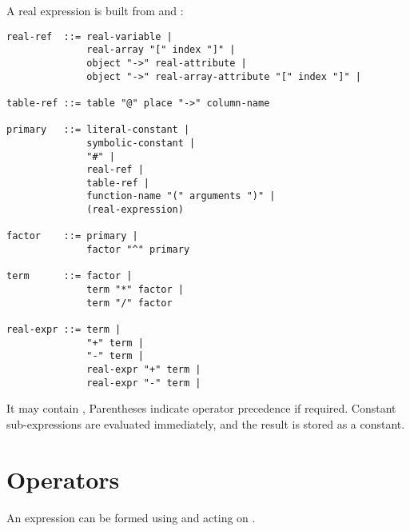 A real expression is built from  and 
:

\begin{footnotesize}
\begin{verbatim}
real-ref  ::= real-variable |
              real-array "[" index "]" |
              object "->" real-attribute |
              object "->" real-array-attribute "[" index "]" |

table-ref ::= table "@" place "->" column-name

primary   ::= literal-constant |
              symbolic-constant |
              "#" |
              real-ref |
              table-ref |
              function-name "(" arguments ")" |
              (real-expression)

factor    ::= primary |
              factor "^" primary

term      ::= factor |
              term "*" factor |
              term "/" factor

real-expr ::= term |
              "+" term |
              "-" term |
              real-expr "+" term |
              real-expr "-" term |
\end{verbatim}
\end{footnotesize}

It may contain ,
Parentheses indicate operator precedence if required.
Constant sub-expressions are evaluated immediately,
and the result is stored as a constant.

\section{Operators}
An expression can be formed using  and 
acting on .

